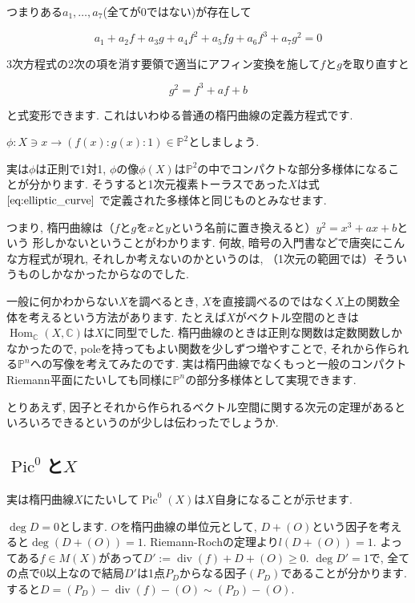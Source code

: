 \documentclass{jsarticle}
\newcommand{\CC}{\mathbb{C}}
\newcommand{\PP}{\mathbb{P}}
\newcommand{\makeop}[1]{\mathop{\mathrm{#1}}\nolimits}
\def\Hom{\makeop{Hom}}
\def\Pic{\makeop{Pic}}
\def\div{\makeop{div}}
\theoremstyle{definition}
\numberwithin{theorem}{section}
\begin{document}
つまりある$a_1, \ldots, a_7$(全てが0ではない)が存在して

\begin{equation*}
a_1 + a_2f + a_3g + a_4f^2+a_5fg+a_6f^3+a_7g^2 = 0
\end{equation*}

3次方程式の2次の項を消す要領で適当にアフィン変換を施して$f$と$g$を取り直すと

\begin{equation}
\label{eq:elliptic_curve}
g^2 = f^3 + af + b
\end{equation}

と式変形できます. これはいわゆる普通の楕円曲線の定義方程式です.

$\phi: X \ni x \rightarrow (f(x):g(x):1) \in \PP^2$としましょう.

実は$\phi$は正則で1対1, $\phi$の像$\phi(X)$は$\PP^2$の中でコンパクトな部分多様体になることが分かります. そうすると1次元複素トーラスであった$X$は式 $\ref{eq:elliptic_curve}$ で定義された多様体と同じものとみなせます.

つまり, 楕円曲線は（$f$と$g$を$x$と$y$という名前に置き換えると）$y^2 = x^3+ax+b$という
形しかないということがわかります. 何故, 暗号の入門書などで唐突にこんな方程式が現れ, それしか考えないのかというのは, （1次元の範囲では）そういうものしかなかったからなのでした.

一般に何かわからない$X$を調べるとき, $X$を直接調べるのではなく$X$上の関数全体を考えるという方法があります. たとえば$X$がベクトル空間のときは$\Hom_\CC(X, \CC)$は$X$に同型でした. 楕円曲線のときは正則な関数は定数関数しかなかったので, poleを持ってもよい関数を少しずつ増やすことで, それから作られる$\PP^n$への写像を考えてみたのです. 実は楕円曲線でなくもっと一般のコンパクトRiemann平面にたいしても同様に$\PP^n$の部分多様体として実現できます.

とりあえず, 因子とそれから作られるベクトル空間に関する次元の定理があるといろいろできるというのが少しは伝わったでしょうか.

\subsection{$\Pic^0$と$X$}
実は楕円曲線$X$にたいして$\Pic^0(X)$は$X$自身になることが示せます.

$\deg D = 0$とします. $O$を楕円曲線の単位元として, $D + (O)$という因子を考えると$\deg(D + (O)) = 1$. Riemann-Rochの定理より$l(D + (O)) = 1$. よってある$f \in M(X)$があって$D' := \div(f) + D + (O) \geq 0$. $\deg D' = 1$で, 全ての点で0以上なので結局$D'$は1点$P_D$からなる因子$(P_D)$であることが分かります. すると$D = (P_D) - \div(f) - (O) \sim (P_D) - (O)$.
\end{document}
